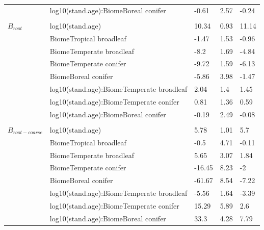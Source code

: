 \documentclass[
]{article}
\begin{document}
\begin{longtable}{lllll}
\hspace{1em} & log10(stand.age):BiomeBoreal conifer & -0.61 & 2.57 & -0.24\\
\addlinespace[1em]
\multicolumn{4}{l}{\textbf{}}\\
\hspace{1em}$B_{root}$ & log10(stand.age) & 10.34 & 0.93 & 11.14\\
\hspace{1em} & BiomeTropical broadleaf & -1.47 & 1.53 & -0.96\\
\hspace{1em} & BiomeTemperate broadleaf & -8.2 & 1.69 & -4.84\\
\hspace{1em} & BiomeTemperate conifer & -9.72 & 1.59 & -6.13\\
\hspace{1em} & BiomeBoreal conifer & -5.86 & 3.98 & -1.47\\
\hspace{1em} & log10(stand.age):BiomeTemperate broadleaf & 2.04 & 1.4 & 1.45\\
\hspace{1em} & log10(stand.age):BiomeTemperate conifer & 0.81 & 1.36 & 0.59\\
\hspace{1em} & log10(stand.age):BiomeBoreal conifer & -0.19 & 2.49 & -0.08\\
\addlinespace[1em]
\multicolumn{4}{l}{\textbf{}}\\
\hspace{1em}$B_{root-coarse}$ & log10(stand.age) & 5.78 & 1.01 & 5.7\\
\hspace{1em} & BiomeTropical broadleaf & -0.5 & 4.71 & -0.11\\
\hspace{1em} & BiomeTemperate broadleaf & 5.65 & 3.07 & 1.84\\
\hspace{1em} & BiomeTemperate conifer & -16.45 & 8.23 & -2\\
\hspace{1em} & BiomeBoreal conifer & -61.67 & 8.54 & -7.22\\
\hspace{1em} & log10(stand.age):BiomeTemperate broadleaf & -5.56 & 1.64 & -3.39\\
\hspace{1em} & log10(stand.age):BiomeTemperate conifer & 15.29 & 5.89 & 2.6\\
\hspace{1em} & log10(stand.age):BiomeBoreal conifer & 33.3 & 4.28 & 7.79\\

\end{longtable}
\end{document}
